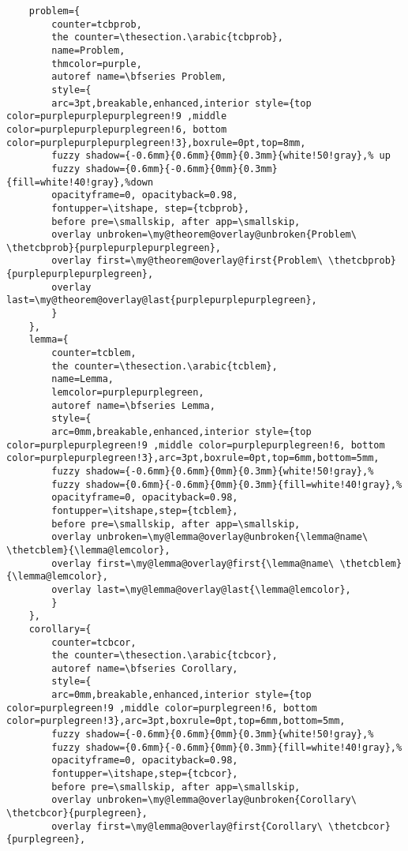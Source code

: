 \documentclass[lang=en,12pt]{beautybook}
\begin{document}
\begin{lstlisting}
    problem={
        counter=tcbprob, 
        the counter=\thesection.\arabic{tcbprob}, 
        name=Problem, 
        thmcolor=purple,
        autoref name=\bfseries Problem, 
        style={
        arc=3pt,breakable,enhanced,interior style={top color=purplepurplepurplegreen!9 ,middle color=purplepurplepurplegreen!6, bottom color=purplepurplepurplegreen!3},boxrule=0pt,top=8mm,
        fuzzy shadow={-0.6mm}{0.6mm}{0mm}{0.3mm}{white!50!gray},% up
        fuzzy shadow={0.6mm}{-0.6mm}{0mm}{0.3mm}{fill=white!40!gray},%down
        opacityframe=0, opacityback=0.98,
        fontupper=\itshape, step={tcbprob},
        before pre=\smallskip, after app=\smallskip,
        overlay unbroken=\my@theorem@overlay@unbroken{Problem\ \thetcbprob}{purplepurplepurplegreen},
        overlay first=\my@theorem@overlay@first{Problem\ \thetcbprob}{purplepurplepurplegreen},
        overlay last=\my@theorem@overlay@last{purplepurplepurplegreen},
        }
    },
    lemma={
        counter=tcblem,
        the counter=\thesection.\arabic{tcblem},
        name=Lemma, 
        lemcolor=purplepurplegreen, 
        autoref name=\bfseries Lemma,
        style={
        arc=0mm,breakable,enhanced,interior style={top color=purplepurplegreen!9 ,middle color=purplepurplegreen!6, bottom color=purplepurplegreen!3},arc=3pt,boxrule=0pt,top=6mm,bottom=5mm,
        fuzzy shadow={-0.6mm}{0.6mm}{0mm}{0.3mm}{white!50!gray},% 
        fuzzy shadow={0.6mm}{-0.6mm}{0mm}{0.3mm}{fill=white!40!gray},%
        opacityframe=0, opacityback=0.98,
        fontupper=\itshape,step={tcblem},
        before pre=\smallskip, after app=\smallskip,
        overlay unbroken=\my@lemma@overlay@unbroken{\lemma@name\ \thetcblem}{\lemma@lemcolor},
        overlay first=\my@lemma@overlay@first{\lemma@name\ \thetcblem}{\lemma@lemcolor},
        overlay last=\my@lemma@overlay@last{\lemma@lemcolor},
        }
    },
    corollary={
        counter=tcbcor,
        the counter=\thesection.\arabic{tcbcor},
        autoref name=\bfseries Corollary,
        style={
        arc=0mm,breakable,enhanced,interior style={top color=purplegreen!9 ,middle color=purplegreen!6, bottom color=purplegreen!3},arc=3pt,boxrule=0pt,top=6mm,bottom=5mm,
        fuzzy shadow={-0.6mm}{0.6mm}{0mm}{0.3mm}{white!50!gray},% 
        fuzzy shadow={0.6mm}{-0.6mm}{0mm}{0.3mm}{fill=white!40!gray},%
        opacityframe=0, opacityback=0.98,
        fontupper=\itshape,step={tcbcor},
        before pre=\smallskip, after app=\smallskip,
        overlay unbroken=\my@lemma@overlay@unbroken{Corollary\ \thetcbcor}{purplegreen},
        overlay first=\my@lemma@overlay@first{Corollary\ \thetcbcor}{purplegreen},

\end{lstlisting}
\end{document}
